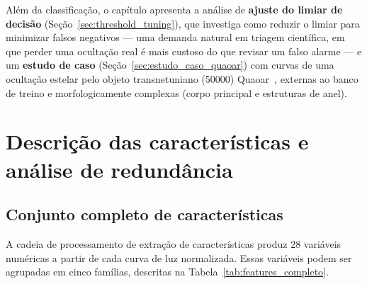 Além da classificação, o capítulo apresenta a análise de \textbf{ajuste do limiar de decisão} (Seção~\ref{sec:threshold_tuning}), que investiga como reduzir o limiar para minimizar falsos negativos --- uma demanda natural em triagem científica, em que perder uma ocultação real é mais custoso do que revisar um falso alarme --- e um \textbf{estudo de caso} (Seção~\ref{sec:estudo_caso_quaoar}) com curvas de uma ocultação estelar pelo objeto transnetuniano (50000) Quaoar~\citep{Morgado2023, Quaoar2023}, externas ao banco de treino e morfologicamente complexas (corpo principal e estruturas de anel).

\section{Descrição das características e análise de redundância}
\label{sec:features_redundancia}

\subsection{Conjunto completo de características}

A cadeia de processamento de extração de características produz 28 variáveis numéricas a partir de cada curva de luz normalizada. Essas variáveis podem ser agrupadas em cinco famílias, descritas na Tabela~\ref{tab:features_completo}.


